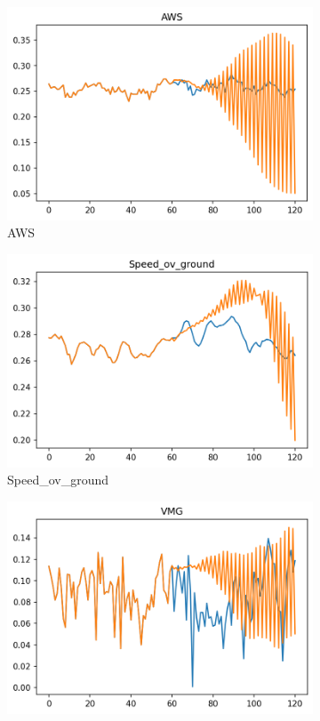 \documentclass[12pt,twoside]{report}
\begin{document}
\begin{figure}[h]
\begin{subfigure}[b]{0.32\textwidth}
         \includegraphics[width=\textwidth]{figures/prediction-plots/AWS.png}
         \caption{AWS}
     \end{subfigure}
     \begin{subfigure}[b]{0.32\textwidth}
         \centering
         \includegraphics[width=\textwidth]{figures/prediction-plots/Speed_ov_ground.png}
         \caption{Speed\_ov\_ground}
     \end{subfigure}
     \begin{subfigure}[b]{0.32\textwidth}
         \centering
         \includegraphics[width=\textwidth]{figures/prediction-plots/VMG.png}

\end{subfigure}
\end{figure}
\end{document}
